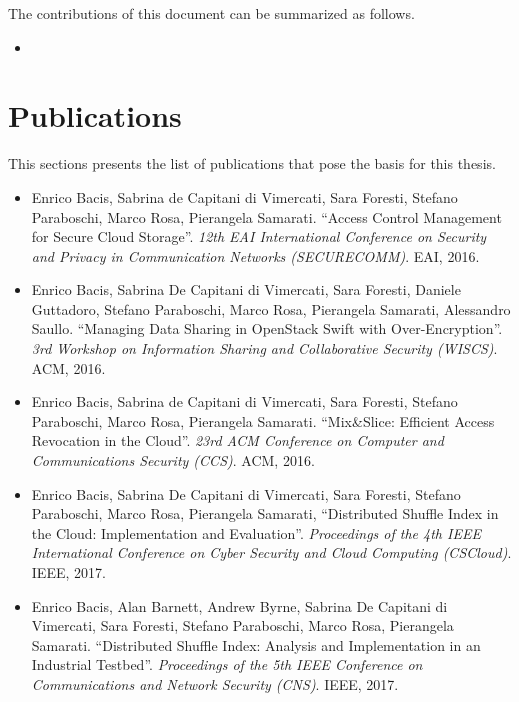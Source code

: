 The contributions of this document can be summarized as follows.

\begin{itemize}
	\item 
\end{itemize}

\bigskip

\section{Publications}

This sections presents the list of publications that pose the basis for this thesis.

\begin{itemize}
	
			\item Enrico Bacis, Sabrina de Capitani di Vimercati, Sara Foresti, Stefano Paraboschi, Marco Rosa, Pierangela Samarati. ``Access Control Management for Secure Cloud Storage''. {\em 12th EAI International Conference on Security and Privacy in Communication Networks (SECURECOMM)}. EAI, 2016.
			
			\item Enrico Bacis, Sabrina De Capitani di Vimercati, Sara Foresti, Daniele Guttadoro, Stefano Paraboschi, Marco Rosa, Pierangela Samarati, Alessandro Saullo. ``Managing Data Sharing in OpenStack Swift with Over-Encryption''. {\em 3rd Workshop on Information Sharing and Collaborative Security (WISCS)}. ACM, 2016.
			
			\item Enrico Bacis, Sabrina de Capitani di Vimercati, Sara Foresti, Stefano Paraboschi, Marco Rosa, Pierangela Samarati. ``Mix\&Slice: Efficient Access Revocation in the Cloud''. {\em 23rd ACM Conference on Computer and Communications Security (CCS)}. ACM, 2016.
			
			\item Enrico Bacis, Sabrina De Capitani di Vimercati, Sara Foresti, Stefano Paraboschi, Marco Rosa, Pierangela Samarati, ``Distributed Shuffle Index in the Cloud: Implementation and Evaluation''. {\em Proceedings of the 4th IEEE International Conference on Cyber Security and Cloud Computing (CSCloud)}. IEEE, 2017.
			
			\item Enrico Bacis, Alan Barnett, Andrew Byrne, Sabrina De Capitani di Vimercati, Sara Foresti, Stefano Paraboschi, Marco Rosa, Pierangela Samarati. ``Distributed Shuffle Index: Analysis and Implementation in an Industrial Testbed''. {\em Proceedings of the 5th IEEE Conference on Communications and Network Security (CNS)}. IEEE, 2017.
			

\end{itemize}
